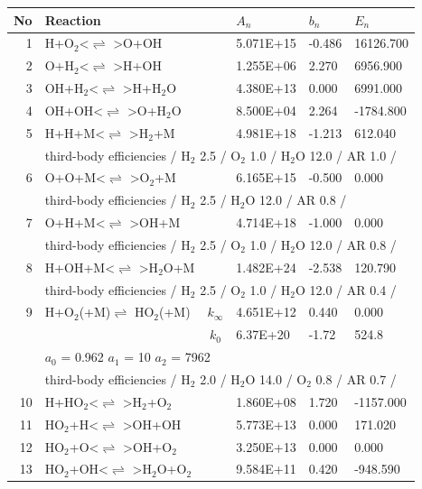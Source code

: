 \documentclass[11pt]{article}
\begin{document}
\begin{table}[hbt]
\begin{tabular}{|r l c l l l|} \hline 
No& Reaction &   & $A_n$& $b_n$ & $E_n$\\ \hline 
1 &	H+O$_{2}$<$\rightleftharpoons$ >O+OH&	&	5.071E+15&	-0.486&	16126.700\\ 
2 &	O+H$_{2}$<$\rightleftharpoons$ >H+OH&	&	1.255E+06&	2.270&	6956.900\\ 
3 &	OH+H$_{2}$<$\rightleftharpoons$ >H+H$_{2}$O&	&	4.380E+13&	0.000&	6991.000\\ 
4 &	OH+OH<$\rightleftharpoons$ >O+H$_{2}$O&	&	8.500E+04&	2.264&	-1784.800\\ 
5 &	H+H+M<$\rightleftharpoons$ >H$_{2}$+M&	&	4.981E+18&	-1.213&	612.040\\ 
	&\multicolumn{5}{l|}{third-body efficiencies  / H$_{2}$ 2.5 / O$_{2}$ 1.0 / H$_{2}$O 12.0 / AR 1.0 /}\\ 
6 &	O+O+M<$\rightleftharpoons$ >O$_{2}$+M&	&	6.165E+15&	-0.500&	0.000\\ 
	&\multicolumn{5}{l|}{third-body efficiencies  / H$_{2}$ 2.5 / H$_{2}$O 12.0 / AR 0.8 /}\\ 
7 &	O+H+M<$\rightleftharpoons$ >OH+M&	&	4.714E+18&	-1.000&	0.000\\ 
	&\multicolumn{5}{l|}{third-body efficiencies  / H$_{2}$ 2.5 / O$_{2}$ 1.0 / H$_{2}$O 12.0 / AR 0.8 /}\\ 
8 &	H+OH+M<$\rightleftharpoons$ >H$_{2}$O+M&	&	1.482E+24&	-2.538&	120.790\\ 
	&\multicolumn{5}{l|}{third-body efficiencies  / H$_{2}$ 2.5 / O$_{2}$ 1.0 / H$_{2}$O 12.0 / AR 0.4 /}\\ 
9 &	H+O$_{2}$(+M)$\rightleftharpoons$ HO$_{2}$(+M)&	$k_{\infty}$&	4.651E+12&	0.440&	0.000\\ 
	&	&	$k_0$&	6.37E+20&-1.72&	  524.8\\ 
	&\multicolumn{5}{l|}{	$a_0$ = 0.962	$a_1$ = 10	$a_2$ = 7962}\\ 
	&\multicolumn{5}{l|}{third-body efficiencies  / H$_{2}$ 2.0 / H$_{2}$O 14.0 / O$_{2}$ 0.8 / AR 0.7 /}\\ 
10 &	H+HO$_{2}$<$\rightleftharpoons$ >H$_{2}$+O$_{2}$&	&	1.860E+08&	1.720&	-1157.000\\ 
11 &	HO$_{2}$+H<$\rightleftharpoons$ >OH+OH&	&	5.773E+13&	0.000&	171.020\\ 
12 &	HO$_{2}$+O<$\rightleftharpoons$ >OH+O$_{2}$&	&	3.250E+13&	0.000&	0.000\\ 
13 &	HO$_{2}$+OH<$\rightleftharpoons$ >H$_{2}$O+O$_{2}$&	&	9.584E+11&	0.420&	-948.590\\ 

\end{tabular}
\end{table}
\end{document}
